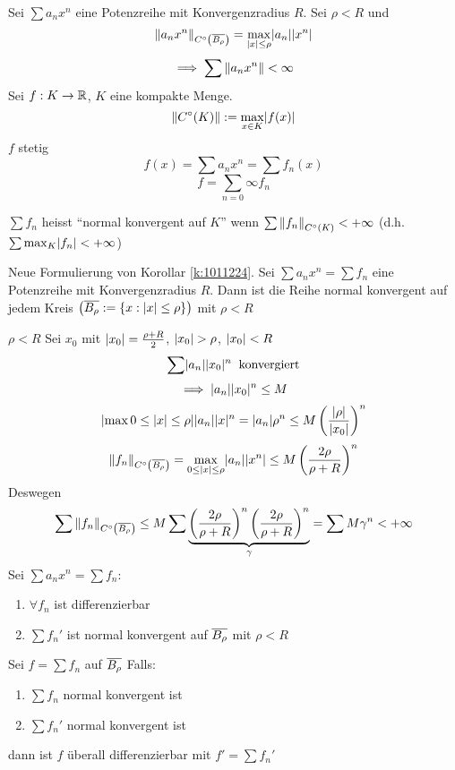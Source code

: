 \begin{Kor}\label{k:1011224}
  Sei $\sum a_nx^n$ eine Potenzreihe mit Konvergenzradius $R$. Sei $\rho<R$ und 
  \[\left\| a_nx^n \right\|_{C^\circ\left( \overline{B_\rho} \right)}=\max_{\mathopen| x \mathclose|\leq \rho}\mathopen| a_n \mathclose|\mathopen| x^n \mathclose|\]
  \[\implies \sum \left\| a_nx^n \right\|<\infty\]
  Sei $f:K\to\mathbb{R}$, $K$ eine kompakte Menge.
  \[\left\| C^\circ(K) \right\|:=\max_{x\in K}\mathopen| f(x) \mathclose|\]
  $f$ stetig
  \[f(x)=\sum a_nx^n=\sum f_n(x)\]
  \[f=\sum_{n=0}\infty f_n\]
\end{Kor}
\begin{Def}
  $\sum f_n$ heisst ``normal konvergent auf $K$'' wenn $\sum\left\| f_n \right\|_{C^\circ(K)}<+\infty$ (d.h. $\sum\max_{K}\mathopen| f_n \mathclose|<+\infty$)
\end{Def}
\begin{Kor} Neue Formulierung von Korollar \ref{k:1011224}. Sei $\sum a_nx^n=\sum f_n$ eine Potenzreihe mit Konvergenzradius $R$. Dann ist die Reihe normal konvergent auf jedem Kreis $\left( \overline{B_\rho}:=\left\{ x:\mathopen| x \mathclose|\leq \rho \right\} \right)$ mit $\rho < R$
\end{Kor}
\begin{Bew}
  $\rho <R$ Sei $x_0$ mit $\mathopen| x_0 \mathclose|=\frac{\rho+R}{2}$, $\abs{x_0}>\rho$, $\mathopen| x_0 \mathclose|<R$
  \[\sum\mathopen| a_n \mathclose|\mathopen| x_0 \mathclose|^n\hspace{2mm}\text{konvergiert}\]
  \[\implies \mathopen| a_n \mathclose|\mathopen| x_0 \mathclose|^n\leq M\]
  \[\mathopen| \max{0\leq\mathopen| x \mathclose|}\leq \rho \mathclose|\mathopen| a_n \mathclose|\mathopen| x \mathclose|^n=\mathopen| a_n \mathclose|\rho^n\leq M\left( \frac{\mathopen| \rho \mathclose|}{\mathopen| x_0 \mathclose|} \right)^n\]
  \[\left\| f_n \right\|_{C^\circ\left( \overline{B_\rho} \right)}=\max_{0\leq\mathopen| x \mathclose|\leq \rho}\mathopen| a_n \mathclose|\mathopen| x^n \mathclose|\leq M\left( \frac{2\rho}{\rho+R} \right)^n\]
  Deswegen
  \[\sum\left\| f_n \right\|_{C^\circ\left( \overline{B_\rho} \right)}\leq M\sum \underbrace{\left( \frac{2\rho}{\rho+R} \right)^n\left( \frac{2\rho}{\rho+R} \right)^n}_{\gamma}=\sum M\gamma^n<+\infty\]
  Sei $\sum a_nx^n=\sum f_n$:
  \begin{enumerate}
    \item $\forall f_n$ ist differenzierbar
    \item $\sum f_n'$ ist normal konvergent auf $\overline{B_\rho}$ mit $\rho < R$
  \end{enumerate}
\end{Bew}
\begin{theorem}
  Sei $f=\sum f_n$ auf $\overline{B_\rho}$ Falls:
  \begin{enumerate}
    \item $\sum f_n$ normal konvergent ist
    \item $\sum f_n'$ normal konvergent ist
  \end{enumerate}
  dann ist $f$ überall differenzierbar mit $f'=\sum f_n'$
\end{theorem}
